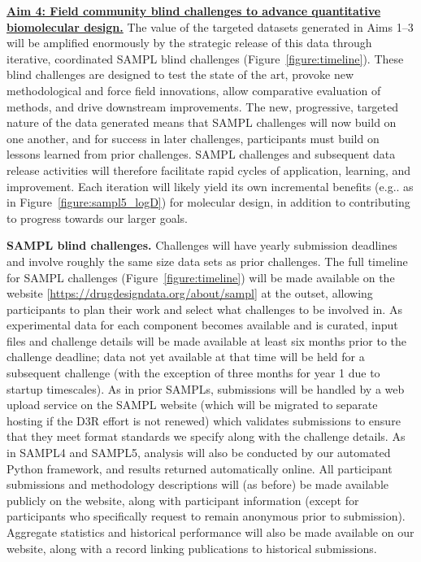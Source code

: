 \documentclass[11pt]{article}
\begin{document}
\textbf{\underline{Aim 4: Field community blind challenges to advance quantitative biomolecular design.}}
The value of the targeted datasets generated in Aims 1--3 will be amplified enormously by the strategic release of this data through iterative, coordinated SAMPL blind challenges (Figure~\ref{figure:timeline}).
These blind challenges are designed to test the state of the art, provoke new methodological and force field innovations, allow comparative evaluation of methods, and drive downstream improvements.
The new, progressive, targeted nature of the data generated means that SAMPL challenges will now build on one another, and for success in later challenges, participants must build on lessons learned from prior challenges.
SAMPL challenges and subsequent data release activities will therefore facilitate rapid cycles of application, learning, and improvement.
Each iteration will likely yield its own incremental benefits (e.g.. as in Figure~\ref{figure:sampl5_logD}) for molecular design, in addition to contributing to progress towards our larger goals.

{\bf SAMPL blind challenges.} Challenges will have yearly submission deadlines and involve roughly the same size data sets as prior challenges.
The full timeline for SAMPL challenges (Figure~\ref{figure:timeline}) will be made available on the website [\url{https://drugdesigndata.org/about/sampl}] at the outset, allowing participants to plan their work and select what challenges to be involved in.
As experimental data for each component becomes available and is curated, input files and challenge details will be made available at least six months prior to the challenge deadline; data not yet available at that time will be held for a subsequent challenge (with the exception of three months for year 1 due to startup timescales).
As in prior SAMPLs, submissions will be handled by a web upload service on the SAMPL website (which will be migrated to separate hosting if the D3R effort is not renewed) which validates submissions to ensure that they meet format standards we specify along with the challenge details. 
As in SAMPL4 and SAMPL5, analysis will also be conducted by our automated Python framework, and results returned automatically online.
All participant submissions and methodology descriptions will (as before) be made available publicly on the website, along with participant information (except for participants who specifically request to remain anonymous prior to submission).
Aggregate statistics and historical performance will also be made available on our website, along with a record linking publications to historical submissions.
\end{document}
